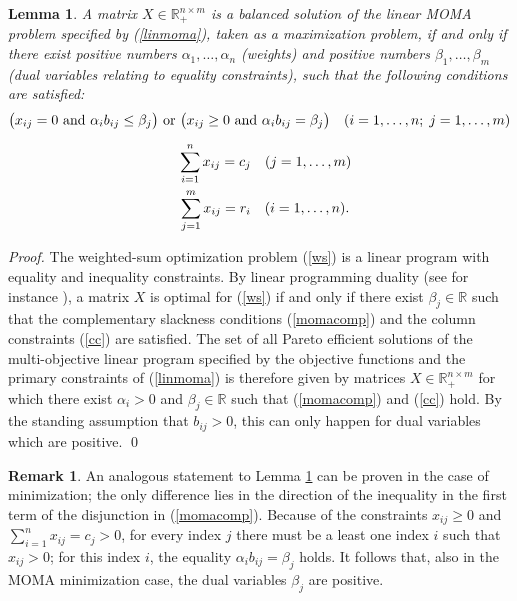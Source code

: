 \documentclass{article}
\newcommand{\mR}{\mathbb{R}}
\newcommand{\ed}[1]{{\rm #1}}
\newtheorem{lemma}[theorem]{Lemma}
\theoremstyle{definition}
\newtheorem{remark}[theorem]{Remark}
\begin{document}
\begin{lemma} \label{charlemma}
A matrix $X \in \mR_+^{n \times m}$ is a balanced solution of the linear \ed{MOMA} problem specified by \ed{(\ref{linmoma})}, taken as a maximization problem, if and only if there exist positive numbers $\alpha_1,\dots,\alpha_n$ (weights) and positive numbers $\beta_1,\dots,\beta_m$ (dual variables relating to equality constraints), such that the following conditions are satisfied:
\begin{subequations} \label{char}
\begin{align}
\big(x_{ij}=0 \text{ and } \alpha_i b_{ij} \leq \beta_j\big) \text{ or }
\big(x_{ij} \geq 0 \text{ and } \alpha_i b_{ij} = \beta_j\big)  \quad  (i=1,\dots,n;\; j = 1,\dots,m) \label{momacomp} \\[2mm]
\sum_{i=1}^n x_{ij} = c_j \quad (j=1,\dots,m) \hspace{4cm} \label{cc} \\
\sum_{j=1}^m x_{ij} = r_i \quad (i=1,\dots,n). \hspace{4.05cm}
\end{align}
\end{subequations}
\end{lemma}

\begin{proof}
The weighted-sum optimization problem (\ref{ws}) is a linear program with equality and inequality constraints. By linear programming duality (see for instance \cite{Schrijver98}), a matrix $X$ is optimal for (\ref{ws}) if and only if there exist $\beta_j \in \mR$ such that the complementary slackness conditions (\ref{momacomp}) and the column constraints (\ref{cc}) are satisfied. The set of all Pareto efficient solutions of the multi-objective linear program specified by the objective functions and the primary constraints of (\ref{linmoma}) is therefore given by matrices $X \in \mR_+^{n \times m}$ for which there exist $\alpha_i > 0$ and $\beta_j \in \mR$ such that (\ref{momacomp}) and (\ref{cc}) hold. By the standing assumption that $b_{ij}>0$, this can only happen for dual variables which are positive.
\qed
\end{proof}

\begin{remark}
An analogous statement to Lemma \ref{charlemma} can be proven in the case of minimization; the only difference lies in the direction of the inequality in the first term of the disjunction in (\ref{momacomp}). Because of the constraints $x_{ij} \geq 0$ and $\sum_{i=1}^n x_{ij} = c_j > 0$, for every index $j$ there must be a least one index $i$ such that $x_{ij} > 0$; for this index $i$, the equality $\alpha_i b_{ij} = \beta_j$ holds. It follows that, also in the MOMA minimization case, the dual variables $\beta_j$ are positive.
\end{remark}
\end{document}
